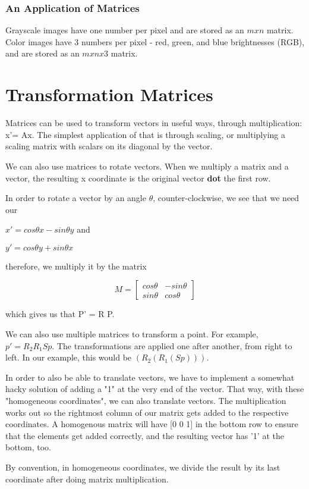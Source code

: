 \documentclass{article}
\begin{document}
\subsubsection{An Application of Matrices}
Grayscale images have one number per pixel and are stored as an $mxn$ matrix. Color images have 3 numbers per pixel - red, green, and blue brightnesses (RGB), and are stored as an $mxnx3$ matrix.
\section{Transformation Matrices}
Matrices can be	used to transform vectors in useful ways, through multiplication: 
x’= Ax. The simplest application of that is through scaling, or multiplying a scaling matrix with scalars on its diagonal by the vector. 

We can also use matrices to rotate vectors. When we multiply a matrix and a vector, the resulting x coordinate is the original vector \textbf{dot} the first row. 


In order to rotate a vector by an angle $\theta$, counter-clockwise, we see that we need our 

$x'= cos\theta x -sin \theta y$ and

$y'= cos\theta y +sin \theta x$

therefore, we multiply it by the matrix

\[
M=
  \begin{bmatrix}
    cos\theta & -sin\theta \\
    sin\theta & cos\theta
  \end{bmatrix}
\]

which gives us that P' = R P. 

We can also use multiple matrices to transform a point. For example, $p' = R_2 R_1 S p$. The transformations are applied one after another, from right to left. In our example, this would be $(R_2(R_1(S p)))$. 

In order to also be able to translate vectors, we have to implement a somewhat hacky solution of adding a "1" at the very end of the vector. That way, with these "homogeneous coordinates", we can also translate vectors. The multiplication works out so the rightmost column of our matrix gets added to the respective coordinates. A homogenous matrix will have [0 0 1] in the bottom row to ensure that the elements get added correctly, and the resulting vector has '1' at the bottom, too. 

By convention, in homogeneous coordinates, we divide the result by its last coordinate after doing matrix multiplication. 
\end{document}
